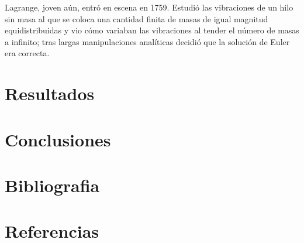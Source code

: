 \documentclass[a4paper,12pt]{article}
\begin{document}
\indent Lagrange, joven aún, entró en escena en 1759. Estudió las vibraciones de un hilo sin masa al que se coloca una cantidad finita de masas de igual magnitud equidistribuidas y vio cómo variaban las vibraciones al tender el
número de masas a infinito; tras largas manipulaciones analíticas decidió que la solución de Euler era correcta.\\

\section{Resultados}

\section{Conclusiones}

\section{Bibliografia}

\section{Referencias}
\end{document}
